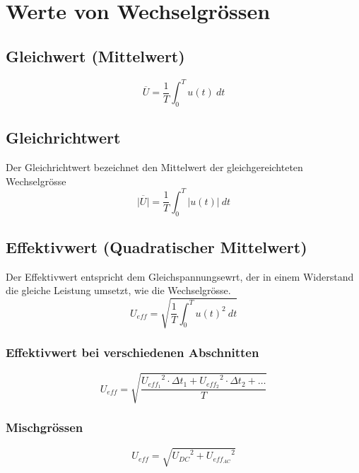 



\section{Werte von Wechselgrössen}

\subsection{Gleichwert (Mittelwert)}
\[ \overline{U} = \frac{1}{T} \int_0^T u(t) ~ dt \]

\subsection{Gleichrichtwert}
Der Gleichrichtwert bezeichnet den Mittelwert der gleichgereichteten 
Wechselgrösse
\[ \overline{|U|} = \frac{1}{T} \int_0^T |u(t)| ~ dt \]

\subsection{Effektivwert (Quadratischer Mittelwert)}
Der Effektivwert entspricht dem Gleichspannungsewrt, der in einem Widerstand 
die gleiche Leistung umsetzt, wie die Wechselgrösse. 
\[ U_{eff} = \sqrt{\frac{1}{T} \int_0^T u(t)^2 ~ dt} \]

\subsubsection{Effektivwert bei verschiedenen Abschnitten}
\[ U_{eff} = \sqrt{\frac{{U_{eff_1}}^2 \cdot \Delta t_1 
+ {U_{eff_2}}^2 \cdot \Delta t_2 + \dots}{T}} \]

\subsubsection{Mischgrössen}
\[ U_{eff} = \sqrt{{U_{DC}}^2 + {U_{eff_{AC}}}^2} \]